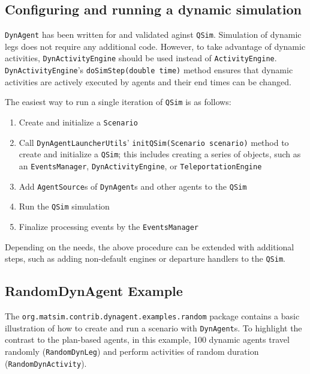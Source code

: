 \subsection{Configuring and running a dynamic simulation}
\label{sec:config-dyn-sim}

\lstinline$DynAgent$ has been written for and validated aginst \lstinline$QSim$. Simulation of dynamic legs does not require any additional code. However, to take advantage of dynamic activities,  \lstinline$DynActivityEngine$ should be used instead of \lstinline$ActivityEngine$. \lstinline$DynActivityEngine$'s \lstinline$doSimStep(double time)$ method ensures that dynamic activities are actively executed by agents and their end times can be changed.

The easiest way to run a single iteration of \lstinline$QSim$ is as follows:
%
\begin{enumerate}
	\item Create and initialize a \lstinline$Scenario$

	\item Call \lstinline$DynAgentLauncherUtils$' \lstinline$initQSim(Scenario scenario)$ method to create and initialize a \lstinline$QSim$; this includes creating a series of objects, such as an \lstinline$EventsManager$, \lstinline$DynActivityEngine$, or \lstinline$TeleportationEngine$

	\item Add \lstinline$AgentSource$s of \lstinline$DynAgent$s and other agents to the \lstinline$QSim$
	
	\item Run the \lstinline$QSim$ simulation
	
	\item Finalize processing events by the \lstinline$EventsManager$
	
\end{enumerate}
%
Depending on the needs, the above procedure can be extended with additional steps, such as adding non-default engines or departure handlers to the \lstinline$QSim$.

\subsection{RandomDynAgent Example}

The \lstinline$org.matsim.contrib.dynagent.examples.random$ package contains a basic illustration of how to create and run a scenario with \lstinline$DynAgent$s. To highlight the contrast to the plan-based agents, in this example, 100 dynamic agents travel randomly (\lstinline$RandomDynLeg$) and perform activities of random duration (\lstinline$RandomDynActivity$).

